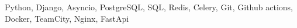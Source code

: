 \documentclass[a4paper, 12pt]{article}
\begin{document}
Python, Django, Asyncio, PostgreSQL, SQL, Redis, Celery, Git, Github actions, Docker, TeamCity, Nginx, FastApi
\end{document}
